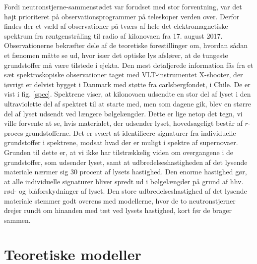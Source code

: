 \documentclass[twocolumn]{article}
\begin{document}
Fordi neutronstjerne-sammenstødet var forudset med stor forventning, var det højt prioriteret på observationsprogrammer på teleskoper verden over. Derfor findes der et væld af observationer på tværs af hele det elektromagnetiske spektrum fra røntgenstråling til radio af kilonovaen fra 17. august 2017. Observationerne bekræfter dele af de teoretiske forestillinger om, hvordan sådan et fænomen måtte se ud, hvor især det optiske lys afslører, at de tungeste grundstoffer må være tilstede i ejekta. Den mest detaljerede information fås fra et sæt spektroskopiske observationer taget med VLT-instrumentet X-shooter, der iøvrigt er delvist bygget i Danmark med støtte fra carlsbergfondet, i Chile. De er vist i fig. \ref{spec}. Spektrene viser, at kilonovaen udsendte en stor del af lyset i den ultraviolette del af spektret til at starte med, men som dagene gik, blev en større del af lyset udsendt ved længere bølgelængder. Dette er lige netop det tegn, vi ville forvente at se, hvis materialet, der udsender lyset, hovedsageligt består af $r$-proces-grundstofferne. Det er svært at identificere signaturer fra individuelle grundstoffer i spektrene, modsat hvad der er muligt i spektre af supernovaer. Grunden til dette er, at vi ikke har tilstrækkelig viden om overgangene i de grundstoffer, som udsender lyset, samt at udbredelseshastigheden af det lysende materiale nærmer sig 30 procent af lysets hastighed. Den enorme hastighed gør, at alle individuelle signaturer bliver spredt ud i bølgelængder på grund af hhv. rød- og blåforskydninger af lyset. Den store udbredelseshastighed af det lysende materiale stemmer godt overens med modellerne, hvor de to neutronstjerner drejer rundt om hinanden med tæt ved lysets hastighed, kort før de brager sammen. 


\section{Teoretiske modeller}\label{teo}
\end{document}
